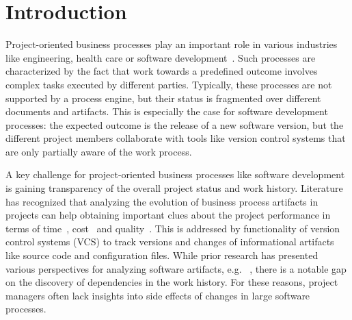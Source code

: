 \section{Introduction}

Project-oriented business processes play an important role in various industries like engineering, health care or software development~\cite{Bala2015}. Such processes are characterized by the fact that work towards a predefined outcome involves complex tasks executed by different parties. Typically, these processes are not supported by a process engine, but their status is fragmented over different documents and artifacts.
This is especially the case for software development processes: the expected outcome is the release of a new software version, but the different project members collaborate with tools like version control systems that are only partially aware of the work process. %

A key challenge for project-oriented business processes like software development is gaining transparency of the overall project status and work history. Literature has recognized that analyzing the evolution of business process artifacts in projects can help obtaining important clues about the project performance in terms of time~\cite{Beheshti2016}, cost~\cite{Voinea2007a} and quality~\cite{lindberg2016coordinating}. This is addressed by functionality of version control systems (VCS) to track versions and changes of informational artifacts like source code and configuration files. While prior research has presented various perspectives for analyzing software artifacts, e.g.~
\cite{Bani2016,Robles:2014:EDE:2597073.2597107,Mittal2014,Weicheng2013}, there is a notable gap on the discovery of dependencies in the work history. For these reasons, project managers often lack insights into side effects of changes in large software processes.

